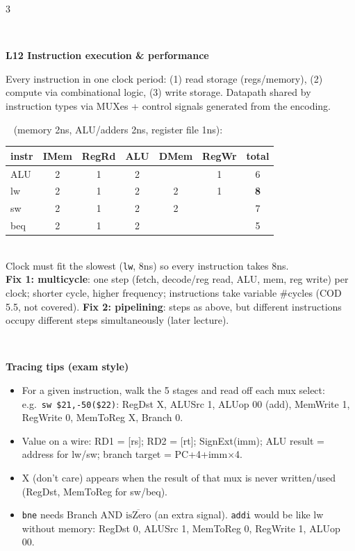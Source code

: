 \documentclass[landscape]{article}
\newcommand{\sect}[1]{\par\vspace{2pt}\noindent{\color{cur}\rule[-1.5pt]{\linewidth}{0.4pt}}\\[-7.5pt]%
  \noindent\colorbox{cur!12}{\parbox{\dimexpr\linewidth-2\fboxsep}{\color{cur}\bfseries #1}}\par\vspace{0.5pt}}
\newcommand{\sub}[1]{\par\vspace{1pt}{\color{cur}\bfseries #1}\ }
\newcommand{\key}[1]{\textbf{\color{BrickRed}#1}}
\newcommand{\tc}[1]{\texttt{#1}}
\begin{document}
\begin{multicols}{3}
\sect{L12 \; Instruction execution \& performance}
Every instruction in one clock period: (1) read storage (regs/memory), (2) compute via combinational logic, (3) write storage. Datapath shared by instruction types via MUXes + control signals generated from the encoding.\\
\sub{Single-cycle shortcoming} (memory 2ns, ALU/adders 2ns, register file 1ns):\\
\begin{tabular}{@{}lcccccc@{}}\toprule
instr & IMem & RegRd & ALU & DMem & RegWr & total\\\midrule
ALU & 2 & 1 & 2 & & 1 & 6\\
lw & 2 & 1 & 2 & 2 & 1 & \textbf{8}\\
sw & 2 & 1 & 2 & 2 & & 7\\
beq & 2 & 1 & 2 & & & 5\\\bottomrule
\end{tabular}\\
Clock must fit the slowest (\tc{lw}, 8ns) so every instruction takes 8ns.\\
\key{Fix 1: multicycle}: one step (fetch, decode/reg read, ALU, mem, reg write) per clock; shorter cycle, higher frequency; instructions take variable \#cycles (COD 5.5, not covered). \key{Fix 2: pipelining}: steps as above, but different instructions occupy different steps simultaneously (later lecture).

\sect{Tracing tips (exam style)}
\begin{itemize}
\item For a given instruction, walk the 5 stages and read off each mux select: e.g.\ \tc{sw \$21,-50(\$22)}: RegDst X, ALUSrc 1, ALUop 00 (add), MemWrite 1, RegWrite 0, MemToReg X, Branch 0.
\item Value on a wire: RD1 = [rs]; RD2 = [rt]; SignExt(imm); ALU result = address for lw/sw; branch target = PC+4+imm$\times$4.
\item X (don't care) appears when the result of that mux is never written/used (RegDst, MemToReg for sw/beq).
\item \tc{bne} needs Branch AND $\overline{\text{isZero}}$ (an extra signal). \tc{addi} would be like lw without memory: RegDst 0, ALUSrc 1, MemToReg 0, RegWrite 1, ALUop 00.
\end{itemize}

\end{multicols}
\end{document}
